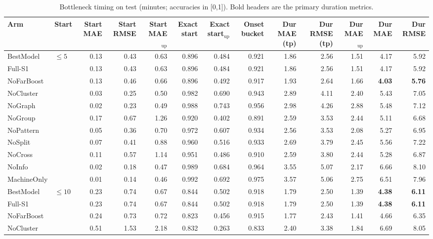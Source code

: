\documentclass[9pt,a4paper,twocolumn]{extarticle}
\begin{document}
\begin{table}[tp]
\centering\scriptsize\setlength{\tabcolsep}{3.2pt}
\caption{Bottleneck timing on test (minutes; accuracies in [0,1]). Bold headers are the primary duration metrics.}
\begin{tabular}{llrrrrrrrrrrr}
\toprule
Arm & Start & Start MAE & Start RMSE & Start MAE$_{\mathrm{up}}$ & Exact start & Exact start$_{\mathrm{up}}$ & Onset bucket & Dur MAE (tp) & Dur RMSE (tp) & Dur MAE$_{\mathrm{up}}$ & \textbf{Dur MAE} & \textbf{Dur RMSE} \\
\midrule
BestModel & $\le 5$ & 0.13 & 0.43 & 0.63 & 0.896 & 0.484 & 0.921 & 1.86 & 2.56 & 1.51 & 4.17 & 5.92 \\
Full-S1 &  & 0.13 & 0.43 & 0.63 & 0.896 & 0.484 & 0.921 & 1.86 & 2.56 & 1.51 & 4.17 & 5.92 \\
NoFarBoost &  & 0.13 & 0.46 & 0.66 & 0.896 & 0.492 & 0.917 & 1.93 & 2.64 & 1.66 & \textbf{4.03} & \textbf{5.76} \\
NoCluster &  & 0.03 & 0.25 & 0.50 & 0.982 & 0.690 & 0.943 & 2.89 & 4.11 & 2.40 & 5.43 & 7.05 \\
NoGraph &  & 0.02 & 0.23 & 0.49 & 0.988 & 0.743 & 0.956 & 2.98 & 4.26 & 2.88 & 5.48 & 7.12 \\
NoGroup &  & 0.17 & 0.67 & 1.26 & 0.920 & 0.402 & 0.891 & 2.59 & 3.53 & 2.44 & 5.11 & 6.68 \\
NoPattern &  & 0.05 & 0.36 & 0.70 & 0.972 & 0.607 & 0.934 & 2.56 & 3.53 & 2.08 & 5.27 & 6.95 \\
NoSplit &  & 0.07 & 0.41 & 0.88 & 0.960 & 0.516 & 0.933 & 2.69 & 3.79 & 2.45 & 5.56 & 7.22 \\
NoCross &  & 0.11 & 0.57 & 1.14 & 0.951 & 0.486 & 0.910 & 2.59 & 3.80 & 2.44 & 5.28 & 6.87 \\
NoInfo &  & 0.02 & 0.18 & 0.47 & 0.989 & 0.684 & 0.964 & 3.55 & 5.07 & 2.17 & 6.66 & 8.10 \\
MachineOnly &  & 0.01 & 0.14 & 0.46 & 0.992 & 0.692 & 0.975 & 3.57 & 5.06 & 2.75 & 6.51 & 7.96 \\
\midrule
BestModel & $\le 10$ & 0.23 & 0.74 & 0.67 & 0.844 & 0.502 & 0.918 & 1.79 & 2.50 & 1.39 & \textbf{4.38} & \textbf{6.11} \\
Full-S1 &  & 0.23 & 0.74 & 0.67 & 0.844 & 0.502 & 0.918 & 1.79 & 2.50 & 1.39 & \textbf{4.38} & \textbf{6.11} \\
NoFarBoost &  & 0.24 & 0.73 & 0.72 & 0.823 & 0.456 & 0.915 & 1.77 & 2.43 & 1.41 & 4.66 & 6.35 \\
NoCluster &  & 0.51 & 1.53 & 2.18 & 0.832 & 0.263 & 0.833 & 2.40 & 3.38 & 1.84 & 6.69 & 8.05 \\

\end{tabular}
\end{table}
\end{document}
